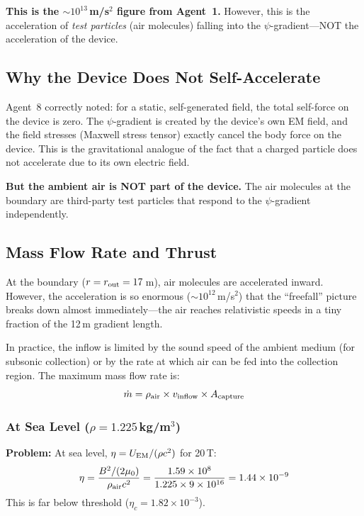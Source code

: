 \documentclass[12pt,letterpaper]{article}
\begin{document}
\textbf{This is the $\sim 10^{13}$\,m/s$^2$ figure from Agent~1.} However, this
is the acceleration of \textit{test particles} (air molecules) falling into the
$\psi$-gradient---NOT the acceleration of the device.

\subsection{Why the Device Does Not Self-Accelerate}

Agent~8 correctly noted: for a static, self-generated field, the total self-force
on the device is zero. The $\psi$-gradient is created by the device's own EM
field, and the field stresses (Maxwell stress tensor) exactly cancel the body
force on the device. This is the gravitational analogue of the fact that a
charged particle does not accelerate due to its own electric field.

\textbf{But the ambient air is NOT part of the device.} The air molecules at
the boundary are third-party test particles that respond to the $\psi$-gradient
independently.

\subsection{Mass Flow Rate and Thrust}

At the boundary ($r = r_{\rm out} = 17$\,m), air molecules are accelerated inward.
However, the acceleration is so enormous ($\sim 10^{12}$\,m/s$^2$) that the
``freefall'' picture breaks down almost immediately---the air reaches relativistic
speeds in a tiny fraction of the 12\,m gradient length.

In practice, the inflow is limited by the sound speed of the ambient medium
(for subsonic collection) or by the rate at which air can be fed into the
collection region. The maximum mass flow rate is:
\begin{equation}
\dot{m} = \rho_{\rm air} \times v_{\rm inflow} \times A_{\rm capture}
\end{equation}

\subsubsection{At Sea Level ($\rho = 1.225$\,kg/m$^3$)}

\textbf{Problem:} At sea level, $\eta = U_{\rm EM}/(\rho c^2)$ for 20\,T:
\begin{equation}
\eta = \frac{B^2/(2\mu_0)}{\rho_{\rm air} c^2} = \frac{1.59 \times 10^8}{1.225 \times 9 \times 10^{16}} = 1.44 \times 10^{-9}
\end{equation}
This is far below threshold ($\eta_c = 1.82 \times 10^{-3}$).
\end{document}
